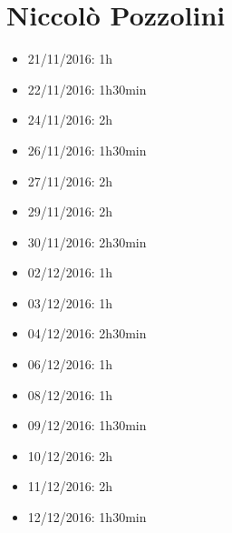 \section{Niccolò Pozzolini}
\begin{itemize}
	\item 21/11/2016: 1h
	\item 22/11/2016: 1h30min
	\item 24/11/2016: 2h
	\item 26/11/2016: 1h30min
	\item 27/11/2016: 2h
	\item 29/11/2016: 2h
	\item 30/11/2016: 2h30min
	\item 02/12/2016: 1h
	\item 03/12/2016: 1h
	\item 04/12/2016: 2h30min
	\item 06/12/2016: 1h
	\item 08/12/2016: 1h
	\item 09/12/2016: 1h30min
	\item 10/12/2016: 2h
	\item 11/12/2016: 2h
	\item 12/12/2016: 1h30min
\end{itemize}